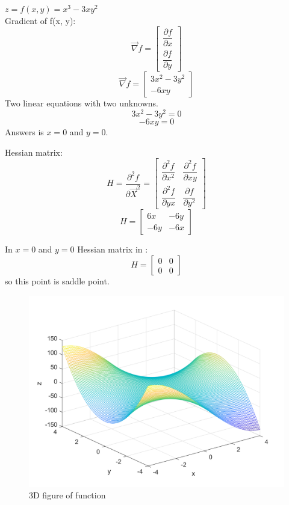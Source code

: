 $z = f(x, y) = x^3 - 3xy^2$ \\
Gradient of f(x, y):
$$\vec{\nabla} f = \begin{bmatrix}
	\dfrac{\partial f}{\partial x} \\[6pt]
	\dfrac{\partial f}{\partial y}
\end{bmatrix} $$
$$\vec{\nabla} f = \begin{bmatrix}
	3x^2 - 3y^2 \\
	-6xy
\end{bmatrix} $$
Two linear equations with two unknowns.
$$	3x^2 - 3y^2 =  0 $$
$$-6xy = 0$$
Answers is $x = 0$ and $y = 0$.


Hessian matrix:
$$H = \dfrac{\partial^2 f}{\partial \vec{X}^2} = \begin{bmatrix}
	\dfrac{\partial^2 f}{\partial x^2} & \dfrac{\partial^2 f}{\partial xy} \\[6pt]
	\dfrac{\partial^2 f}{\partial yx}  & \dfrac{\partial f}{\partial y^2}
\end{bmatrix} $$
$$H = \begin{bmatrix}
	6x & -6y \\
   -6y & -6x
\end{bmatrix}$$



In $x = 0$ and $y = 0$ Hessian matrix in :
$$H = \begin{bmatrix}
	0 & 0 \\
	0 & 0
\end{bmatrix}$$
so this point is saddle point.
\begin{figure}[H]
	\caption{3D figure of function}
	\centering
	\includegraphics[width=12cm]{Q1/figures/3DplotQ1b.png}
\end{figure}

